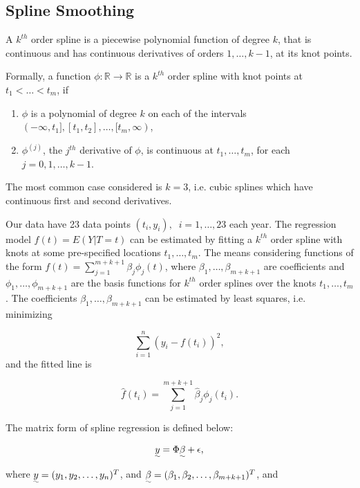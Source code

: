 \documentclass{article}\usepackage[]{graphicx}\usepackage[]{color}
\begin{document}
\subsection{Spline Smoothing}\label{Sec:SplineSmoothing}

A $k^{th}$ order spline is a piecewise polynomial function of degree $k$, that is continuous and has continuous derivatives of orders $1,\dots,k-1$, at its knot points.

Formally, a function $\phi:\mathbb{R}\rightarrow\mathbb{R}$ is a $k^{th}$ order spline with knot points at $t_1<\dots<t_m$, if

\begin{enumerate}
\item $\phi$ is a polynomial of degree $k$ on each of the intervals $(-\infty,t_1],[t_1,t_2],\dots,[t_m,\infty)$,
\item $\phi^{(j)}$, the $j^{th}$ derivative of $\phi$, is continuous at $t_1,\dots,t_m$, for each $j=0,1,\dots,k-1$.
\end{enumerate}

The most common case considered is $k=3$, i.e. cubic splines which have continuous first and second derivatives. 

Our data have 23 data points $(t_i,y_i),\;\;i=1,\dots,23$ each year. The regression model $f(t) = E(Y|T=t)$ can be estimated by fitting a $k^{th}$ order spline with knots at some pre-specified locations $t_1,\dots,t_m$. The means considering functions of the form $f(t)=\sum_{j=1}^{m+k+1}\beta_j\phi_j(t)$, where $\beta_1,\dots,\beta_{m+k+1}$ are coefficients and $\phi_1,\dots,\phi_{m+k+1}$ are the basis functions for $k^{th}$ order splines over the knots $t_1,\dots,t_m$. The coefficients $\beta_1,\dots,\beta_{m+k+1}$ can be estimated by least squares, i.e. minimizing

\begin{equation}
\sum_{i=1}^{n}\left(y_i-f(t_i)\right)^2,
\end{equation}
and the fitted line is 

\begin{equation}
\widehat{f}(t_i) = \sum_{j=1}^{m+k+1}\widehat{\beta}_j\phi_j(t_i).
\end{equation}


The matrix form of spline regression is defined below:

\begin{equation}
\uwave{y} = \Phi\uwave{\beta}+\uwave{\epsilon},
\end{equation}
where $\uwave{y} = (y_1,y_2,\dots,y_n)^{T}$, and $\uwave{\beta} = (\beta_1,\beta_2,\dots,\beta_{m+k+1})^{T}$, and
\end{document}
